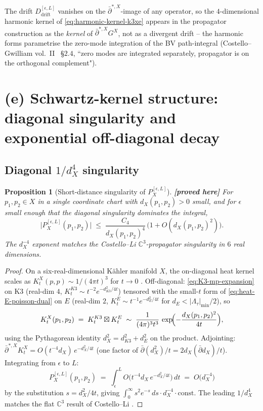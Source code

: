 \documentclass[11pt]{amsart}
\providecommand{\ClaimStatusProvedHere}[1][]{\textbf{[proved here]}}
\providecommand{\dbar}{\bar\partial}
\providecommand{\C}{\mathbb{C}}
\newtheorem{proposition}[theorem]{Proposition}
\theoremstyle{definition}
\theoremstyle{remark}
\begin{document}
The drift $D_{\mathrm{drift}}^{[\epsilon,L]}$ vanishes on the
$\dbar^{*,X}$-image of any operator, so the
$4$-dimensional harmonic kernel of
\eqref{eq:harmonic-kernel-k3xe} appears in the propagator
construction as the \emph{kernel} of $\dbar^{*,X} G^X$, not as
a divergent drift -- the harmonic forms parametrise the
zero-mode integration of the BV path-integral
(Costello--Gwilliam vol.~II~\cite{CostelloGwilliam} \S$2.4$,
``zero modes are integrated separately, propagator is on the
orthogonal complement").

\section{(e) Schwartz-kernel structure: diagonal singularity and
exponential off-diagonal decay}
\label{sec:diagonal-singularity}

\subsection{Diagonal $1/d_X^4$ singularity}

\begin{proposition}[Short-distance singularity of $P_X^{[\epsilon,L]}$]
\label{prop:diagonal-singularity}
\ClaimStatusProvedHere
For $p_1, p_2 \in X$ in a single coordinate chart with
$d_X(p_1,p_2) > 0$ small, and for $\epsilon$ small enough that the
diagonal singularity dominates the integral,
\begin{equation}
  \label{eq:diagonal-singularity}
  \bigl|P_X^{[\epsilon,L]}(p_1,p_2)\bigr|
  \;\leq\;
  \frac{C_4}{d_X(p_1,p_2)^4}\,
  \bigl(1 + O(d_X(p_1,p_2)^2)\bigr).
\end{equation}
The $d_X^{-4}$ exponent matches the Costello--Li
$\C^3$-propagator singularity in $6$ real dimensions.
\end{proposition}

\begin{proof}
On a six-real-dimensional K\"ahler manifold $X$, the on-diagonal
heat kernel scales as $K^X_t(p,p) \sim 1/(4\pi t)^3$ for $t \to 0$
\cite[Cor.~$2.31$]{BerlineGetzlerVergne1992}. Off-diagonal:
\eqref{eq:K3-mp-expansion} on K3 (real-dim $4$, $K^{K3}_t \sim
t^{-2} e^{-d_{K3}^2/4t}$) tensored with the small-$t$ form of
\eqref{eq:heat-E-poisson-dual} on $E$ (real-dim $2$, $K^E_t \sim
t^{-1} e^{-d_E^2/4t}$ for $d_E < |\Lambda_\tau|_{\min}/2$), so
\[
  K^X_t(p_1,p_2) \;=\; K^{K3}_t \boxtimes K^E_t
  \;\sim\; \frac{1}{(4\pi)^3 t^3}\,
  \exp\!\Bigl(-\frac{d_X(p_1,p_2)^2}{4 t}\Bigr),
\]
using the Pythagorean identity
$d_X^2 = d_{K3}^2 + d_E^2$ on the product. Adjointing:
$\dbar^{*,X} K^X_t = O(t^{-4} d_X)\, e^{-d_X^2/4t}$
(one factor of $\bar\partial(d_X^2)/t = 2 d_X (\bar\partial d_X)/t$).
Integrating from $\epsilon$ to $L$:
\[
  P_X^{[\epsilon,L]}(p_1,p_2)
  \;=\;
  \int_\epsilon^L O\bigl(t^{-4} d_X\, e^{-d_X^2/4t}\bigr)\,dt
  \;=\; O\bigl(d_X^{-4}\bigr)
\]
by the substitution $s = d_X^2/4t$, giving
$\int_0^\infty s^2 e^{-s}\,ds \cdot d_X^{-4}\cdot \mathrm{const}$.
The leading $1/d_X^4$ matches the flat $\C^3$ result of
Costello--Li \cite[\S$3$]{CostelloLi2012}.
\end{proof}
\end{document}
